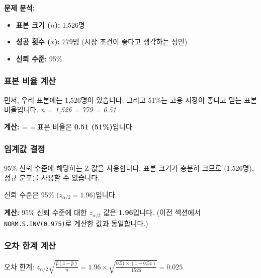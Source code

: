 \documentclass[11pt,a4paper]{book}
\newcommand{\excel}[1]{\texttt{#1}}
\newcommand{\formula}[1]{\textit{#1}}
\theoremstyle{definition}
\begin{document}
\textbf{문제 분석:}
\begin{itemize}
    \item \textbf{표본 크기 ($n$):} 1,526명
    \item \textbf{성공 횟수 ($x$):} 779명 (시장 조건이 좋다고 생각하는 성인)
    \item \textbf{신뢰 수준:} 95\%
\end{itemize}

\subsubsection{표본 비율 계산}

\begin{tcolorbox}[title={슬라이드 71: 지역 고용 시장 조건이 좋은가? (2/2)}]
먼저, 우리 표본에는 1,526명이 있습니다. 그리고 51\%는 고용 시장이 좋다고 믿는 표본 비율입니다.
\formula{n = 1,526}
\formula{ = 779  = 0.51}
\end{tcolorbox}

\textbf{계산:}
\formula{ =  =  }
표본 비율은 \textbf{0.51 (51\%)}입니다.

\subsubsection{임계값 결정}

95\% 신뢰 수준에 해당하는 Z-값을 사용합니다. 표본 크기가 충분히 크므로 (1,526명), 정규 분포를 사용할 수 있습니다.

\begin{tcolorbox}[title={슬라이드 71: 지역 고용 시장 조건이 좋은가? (2/2)}]
신뢰 수준은 95\% ($z_{\alpha/2} = 1.96$)입니다.
\end{tcolorbox}

\textbf{계산:}
95\% 신뢰 수준에 대한 $z_{\alpha/2}$ 값은 \textbf{1.96}입니다. (이전 섹션에서 \excel{NORM.S.INV(0.975)}로 계산한 값과 동일합니다.)

\subsubsection{오차 한계 계산}

\begin{tcolorbox}[title={슬라이드 71: 지역 고용 시장 조건이 좋은가? (2/2)}]
오차 한계: $z_{\alpha/2} \sqrt{\frac{\hat{p}(1-\hat{p})}{n}} = 1.96 \times \sqrt{\frac{0.51 \times (1-0.51)}{1526}} = 0.025$
\end{tcolorbox}
\end{document}
